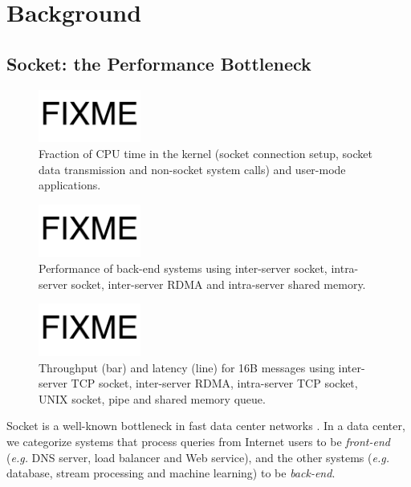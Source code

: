 \section{Background}
\label{sec:background}

\subsection{Socket: the Performance Bottleneck}

\begin{figure}[t]
	\centering
	\includegraphics[width=0.3\textwidth]{images/fixme}
	\caption{Fraction of CPU time in the kernel (socket connection setup, socket data transmission and non-socket system calls) and user-mode applications.}
	\label{fig:socket-kernel-time}
\end{figure}

\begin{figure}[t]
	\centering
	\includegraphics[width=0.3\textwidth]{images/fixme}
	\caption{Performance of back-end systems using inter-server socket, intra-server socket, inter-server RDMA and intra-server shared memory.}
	\label{fig:backend-performance}
\end{figure}

\begin{figure}[t]
	\centering
	\includegraphics[width=0.3\textwidth]{images/fixme}
	\caption{Throughput (bar) and latency (line) for 16B messages using inter-server TCP socket, inter-server RDMA, intra-server TCP socket, UNIX socket, pipe and shared memory queue.}
	\label{fig:socket-comparison}
\end{figure}


Socket is a well-known bottleneck in fast data center networks . In a data center, we categorize systems that process queries from Internet users to be \textit{front-end} (\textit{e.g.} DNS server, load balancer and Web service), and the other systems (\textit{e.g.} database, stream processing and machine learning) to be \textit{back-end}.

